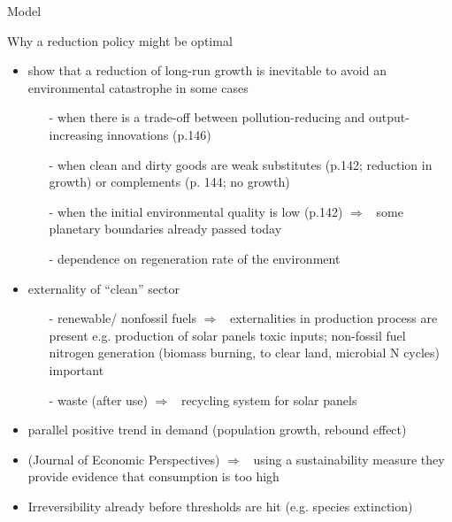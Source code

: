 \documentclass[11pt,aspectratio=169]{beamer}
\newcommand{\ar}{$\Rightarrow$ \ }
\begin{document}
\begin{frame}{Model}

\end{frame}

\begin{frame}[allowframebreaks]{Why a reduction policy might be optimal}
\begin{itemize}
	\item \cite{Acemoglu2012TheChange} show that a reduction of long-run growth is inevitable to avoid an environmental catastrophe in some cases
	\begin{itemize}
\item[-] when there is a trade-off between pollution-reducing and output-increasing innovations (p.146)
\item[-] when clean and dirty goods are weak substitutes (p.142; reduction in growth)  or complements (p. 144; no growth)
\item[-] when the initial environmental quality is low (p.142) \ar some planetary boundaries already passed today \citep{Rockstrom2009AHumanity}
\item[-] dependence on regeneration rate of the environment
	\end{itemize}
\item externality of ``clean'' sector
\begin{itemize}
\item[-] renewable/ nonfossil fuels \ar externalities in production process are present e.g. production of solar panels toxic inputs; non-fossil fuel nitrogen generation (biomass burning, to clear land, microbial N cycles) important \citep{Song2021ImportantEmissions} 
\item[-] waste (after use) \ar recycling system for solar panels 
\end{itemize}
\item parallel positive trend in demand (population growth, rebound effect)
\item \cite{Arrow2004AreMuch}(Journal of Economic Perspectives) \ar using a sustainability measure they provide evidence that consumption is too high
\item Irreversibility already before thresholds are hit (e.g. species extinction)
\end{itemize}
\end{frame}
\end{document}
